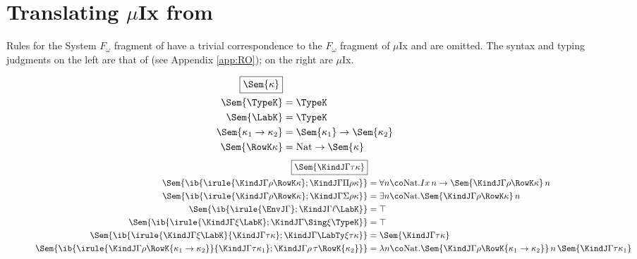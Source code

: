 \documentclass[12pt]{article}
\newcommand\Nat{\mathrm{Nat}}
\newcommand\MuIx{\ensuremath{\mu}Ix}
\begin{document}
\section{Translating \MuIx{} from \RO}
\label{sec:Translation}

Rules for the System $F_{\omega}$ fragment of \RO have a trivial correspondence to the $F_{\omega}$ fragment of \MuIx{} and are omitted. The syntax and typing judgments on the left are that of \RO (see Appendix \ref{app:RO}); on the right are \MuIx.

\begin{figure}[H]
\begin{align*}
\fbox{$\Sem{\kappa}$} \\
\vspace{5em}
\Sem{\TypeK} &= \TypeK \\
\Sem{\LabK} &= \TypeK \\
\Sem{\kappa_1 \to \kappa_2} &= \Sem{\kappa_1} \to \Sem{\kappa_2} \\
\Sem{\RowK \kappa} &= \Nat \to \Sem{\kappa} \\
\end{align*}
\begin{align*}
\fbox{$\Sem{\KindJ \Gamma \tau \kappa}$} \\
\vspace{5em}
\Sem{\ib{\irule
          {\KindJ \Gamma \rho {\RowK \kappa}};
          {\KindJ \Gamma {\Pi\rho} \kappa}}} &= {\forall n \co \Nat. Ix \, n \to \Sem{\KindJ \Gamma \rho {\RowK \kappa}} \, n} \\
\Sem{\ib{\irule
          {\KindJ \Gamma \rho {\RowK \kappa}};
          {\KindJ \Gamma {\Sigma\rho} \kappa}}} &= {\exists n \co \Nat. \Sem{\KindJ \Gamma \rho {\RowK \kappa}} \, n} \\
\Sem{\ib{\irule
          {\EnvJ \Gamma};
          {\KindJ \Gamma \ell \LabK}}} &= \top \\
\Sem{\ib{\irule
          {\KindJ \Gamma \xi \LabK};
          {\KindJ \Gamma {\Sing\xi} \TypeK}}} &= \top \\
\Sem{\ib{\irule
          {\KindJ \Gamma \xi \LabK}
          {\KindJ \Gamma \tau \kappa};
          {\KindJ \Gamma {\LabTy \xi \tau} \kappa}}} &= \Sem{\KindJ \Gamma {\tau} \kappa} \\
\Sem{\ib{\irule
          {\KindJ \Gamma \rho {\RowK{\kappa_1 \to \kappa_2}}}
          {\KindJ \Gamma \tau {\kappa_1}};
          {\KindJ \Gamma {\rho\,\tau} {\RowK{\kappa_2}}}}} &= \lambda n \co \Nat. \Sem{\KindJ \Gamma \rho {\RowK{\kappa_1 \to \kappa_2}}} \, n \, \Sem{{\KindJ \Gamma \tau {\kappa_1}}} \\

\end{align*}
\end{figure}
\end{document}
